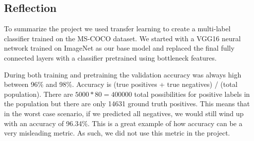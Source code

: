 \documentclass[12pt,journal,compsoc]{IEEEtran}
\begin{document}

\subsection{Reflection}


To summarize the project we used transfer learning to create a multi-label classifier trained on the MS-COCO dataset.  We started with a VGG16 neural network trained on ImageNet as our base model and replaced the final fully connected layers with a classifier pretrained using bottleneck features.  


During both training and pretraining the validation accuracy was always high between 96\% and 98\%. Accuracy is (true positives + true negatives) / (total population).  There are $5000*80=400000$ total possibilities for positive labels in the population but there are only 14631 ground truth positives.  This means that in the worst case scenario, if we predicted all negatives, we would still wind up with an accuracy of 96.34\%. This is a great example of how accuracy can be a very misleading metric. As such, we did not use this metric in the project.
\end{document}
